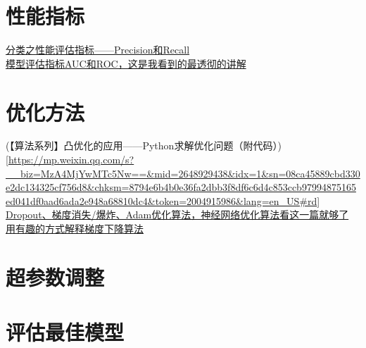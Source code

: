 \documentclass[
]{book}
\begin{document}
\hypertarget{ux6027ux80fdux6307ux6807}{%
\section{性能指标}\label{ux6027ux80fdux6307ux6807}}

\href{https://mp.weixin.qq.com/s?__biz=MzA4MjYwMTc5Nw==\&mid=2648929744\&idx=2\&sn=88bd5e2c1a3e492547fa3a74b57a1a41\&chksm=8794e7fab0e36eec2ed7a8bedeb6d9a2051429291d92592ae2616f36f3fcd60ec08c942d72fe\&token=2004915986\&lang=en_US\#rd}{分类之性能评估指标------Precision和Recall}\\
\href{https://mp.weixin.qq.com/s?__biz=MzA4MjYwMTc5Nw==\&mid=2648931963\&idx=3\&sn=bd5f6c7e2624b711ff8c422996f3f0b2\&chksm=8794ec51b0e36547889976ccc77501a2820c95768b69675580c30b6910836be96aa5d475612d\&token=2004915986\&lang=en_US\#rd}{模型评估指标AUC和ROC，这是我看到的最透彻的讲解}

\hypertarget{ux4f18ux5316ux65b9ux6cd5}{%
\section{优化方法}\label{ux4f18ux5316ux65b9ux6cd5}}

(【算法系列】凸优化的应用------Python求解优化问题（附代码）){[}\url{https://mp.weixin.qq.com/s?__biz=MzA4MjYwMTc5Nw==\&mid=2648929438\&idx=1\&sn=08ca45889cbd330e2dc134325cf756d8\&chksm=8794e6b4b0e36fa2dbb3f8df6c6d4c853ccb97994875165ed041df0aad6ada2e948a68810dc4\&token=2004915986\&lang=en_US\#rd}{]}
\href{https://mp.weixin.qq.com/s?__biz=MzA4MjYwMTc5Nw==\&mid=2648931750\&idx=1\&sn=8134db8eee0fa2bd120b24e7fc01c8e2\&chksm=8794ef8cb0e3669aa56aa4a32efa3fbf4c85f209805490d2b8bd3b316beb8c57d2c10a1b6edd\&token=2004915986\&lang=en_US\#rd}{Dropout、梯度消失/爆炸、Adam优化算法，神经网络优化算法看这一篇就够了}\\
\href{https://mp.weixin.qq.com/s?__biz=MzA4MjYwMTc5Nw==\&mid=2648931235\&idx=2\&sn=5258d235f155a93a8fecc0d8558a01e4\&chksm=8794e989b0e3609fdd82921f218e9c4d4a51316c15e5e38b627bc95171fef230e65391448fc9\&token=2004915986\&lang=en_US\#rd}{用有趣的方式解释梯度下降算法}

\hypertarget{ux8d85ux53c2ux6570ux8c03ux6574}{%
\section{超参数调整}\label{ux8d85ux53c2ux6570ux8c03ux6574}}

\hypertarget{ux8bc4ux4f30ux6700ux4f73ux6a21ux578b}{%
\section{评估最佳模型}\label{ux8bc4ux4f30ux6700ux4f73ux6a21ux578b}}
\end{document}

